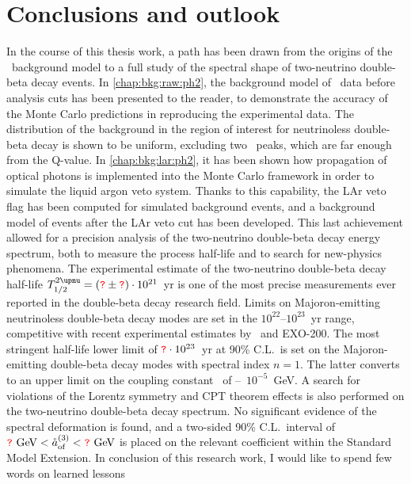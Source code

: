 
\chapter*{Conclusions and outlook}%
\label{chap:concl}

In the course of this thesis work, a path has been drawn from the origins of the \gerda\
background model to a full study of the spectral shape of two-neutrino double-beta decay
events. In \cref{chap:bkg:raw:ph2}, the background model of \gerdatwo\ data before
analysis cuts has been presented to the reader, to demonstrate the accuracy of the Monte
Carlo predictions in reproducing the experimental data. The distribution of the background
in the region of interest for neutrinoless double-beta decay is shown to be uniform,
excluding two \g\ peaks, which are far enough from the Q-value. In
\cref{chap:bkg:lar:ph2}, it has been shown how propagation of optical photons is
implemented into the Monte Carlo framework in order to simulate the liquid argon veto
system. Thanks to this capability, the LAr veto flag has been computed for simulated
background events, and a background model of events after the LAr veto cut has been
developed. This last achievement allowed for a precision analysis of the two-neutrino
double-beta decay energy spectrum, both to measure the process half-life and to search for
new-physics phenomena. The experimental estimate of the two-neutrino double-beta decay
half-life $\thalftwoM = (\fillme{?} \pm \fillme{?}) \cdot 10^{21}$~yr is one of the most
precise measurements ever reported in the double-beta decay research field. Limits on
Majoron-emitting neutrinoless double-beta decay modes are set in the
$10^{22}$--$10^{23}$~yr range, competitive with recent experimental estimates by
\kamlandzen\ and EXO-200. The most stringent half-life lower limit of $\textcolor{red}{\texttt{?}} \cdot
10^{23}$~yr at 90\% C.L.~is set on the Majoron-emitting double-beta decay modes with
spectral index $n=1$. The latter converts to an upper limit on the coupling constant \ga\
of --~$10^{-5}$~GeV. A search for violations of the Lorentz symmetry
and CPT theorem effects is also performed on the two-neutrino double-beta decay spectrum.
No significant evidence of the spectral deformation is found, and a two-sided 90\%
C.L.~interval of $\textcolor{red}{\texttt{?}}~\text{GeV} < {\mathring{a}_\text{of}^{(3)}} < \textcolor{red}{\texttt{?}}~\text{GeV}$ is placed on the
relevant coefficient within the Standard Model Extension.
\newpar
In conclusion of this research work, I would like to spend few words on learned lessons
